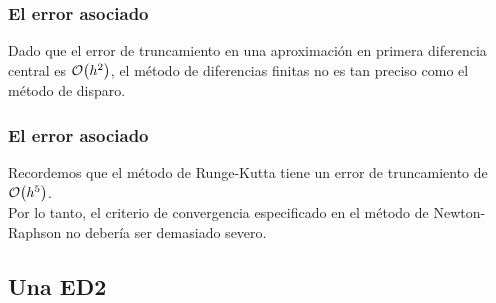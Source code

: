 \documentclass[12pt]{beamer}
\begin{document}
\begin{frame}
\frametitle{El error asociado}
Dado que el error de truncamiento en una aproximación en primera diferencia central es $\order{h^{2}}$, \pause el método de diferencias finitas no es tan preciso como el método de disparo.
\end{frame}
\begin{frame}
\frametitle{El error asociado}
Recordemos que el método de Runge-Kutta tiene un error de truncamiento de $\order{h^{5}}$.
\\
\bigskip
\pause
Por lo tanto, el criterio de convergencia especificado en el método de Newton-Raphson no debería ser demasiado severo.
\end{frame}

\subsection{Una ED2}
\end{document}
